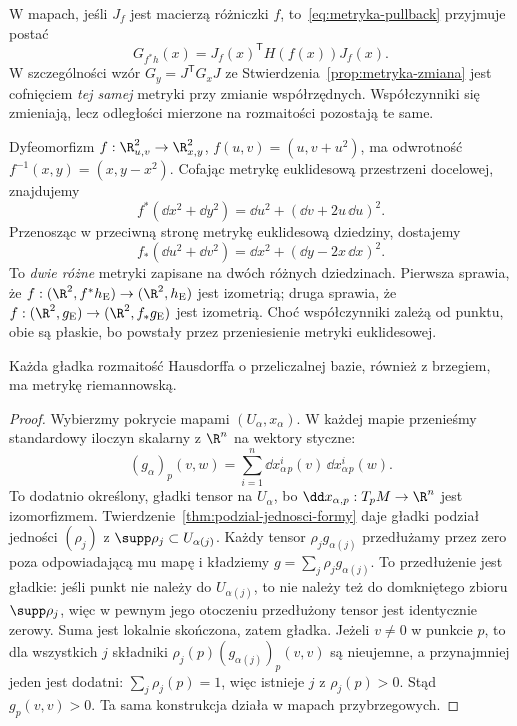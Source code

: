 W mapach, jeśli $J_f$ jest macierzą różniczki $f$,
to~\eqref{eq:metryka-pullback} przyjmuje postać
\[
 G_{f^*h}(x)=J_f(x)^{\mathsf T}H(f(x))J_f(x).
\]
W szczególności wzór
$G_y=J^{\mathsf T}G_xJ$ ze
Stwierdzenia~\ref{prop:metryka-zmiana} jest
cofnięciem \emph{tej samej} metryki przy zmianie
współrzędnych. Współczynniki się zmieniają, lecz
odległości mierzone na rozmaitości pozostają te same.

\begin{przyklad}
\label{prz:metryka-pull-push-przyklad}
Dyfeomorfizm $f:\R^2_{u,v}\to\R^2_{x,y}$,
$f(u,v)=(u,v+u^2)$, ma odwrotność
$f^{-1}(x,y)=(x,y-x^2)$. Cofając metrykę
euklidesową przestrzeni docelowej, znajdujemy
\[
 f^*(\dd x^2+\dd y^2)
 =\dd u^2+(\dd v+2u\,\dd u)^2.
\]
Przenosząc w przeciwną stronę metrykę euklidesową
dziedziny, dostajemy
\[
 f_*(\dd u^2+\dd v^2)
 =\dd x^2+(\dd y-2x\,\dd x)^2.
\]
To \emph{dwie różne} metryki zapisane na dwóch
różnych dziedzinach. Pierwsza sprawia, że
$f:(\R^2,f^*h_{\mathrm E})\to(\R^2,h_{\mathrm E})$
jest izometrią; druga sprawia, że
$f:(\R^2,g_{\mathrm E})\to(\R^2,f_*g_{\mathrm E})$
jest izometrią. Choć współczynniki zależą od punktu,
obie są płaskie, bo powstały przez przeniesienie
metryki euklidesowej.
\end{przyklad}

\begin{twierdzenie}
\label{thm:istnienie-metryki}
Każda gładka rozmaitość Hausdorffa o przeliczalnej bazie,
również z brzegiem, ma metrykę riemannowską.
\end{twierdzenie}
\begin{proof}
Wybierzmy pokrycie mapami $(U_\alpha,x_\alpha)$.
W każdej mapie przenieśmy standardowy iloczyn skalarny
z $\R^n$ na wektory styczne:
\[
 (g_\alpha)_p(v,w)
 =\sum_{i=1}^n
   \dd x_\alpha^i{}_p(v)\,\dd x_\alpha^i{}_p(w).
\]
To dodatnio określony, gładki tensor na $U_\alpha$,
bo $\dd x_{\alpha,p}:T_pM\to\R^n$ jest izomorfizmem.
Twierdzenie~\ref{thm:podzial-jednosci-formy}
daje gładki podział jedności $(\rho_j)$
z $\supp\rho_j\subset U_{\alpha(j)}$.
Każdy tensor $\rho_jg_{\alpha(j)}$ przedłużamy przez
zero poza odpowiadającą mu mapę i kładziemy
$g=\sum_j\rho_jg_{\alpha(j)}$.
To przedłużenie jest gładkie: jeśli punkt nie należy
do $U_{\alpha(j)}$, to nie należy też do domkniętego
zbioru $\supp\rho_j$, więc w pewnym jego otoczeniu
przedłużony tensor jest identycznie zerowy.
Suma jest lokalnie skończona, zatem gładka.
Jeżeli $v\ne0$ w punkcie $p$, to dla wszystkich $j$
składniki $\rho_j(p)(g_{\alpha(j)})_p(v,v)$ są
nieujemne, a przynajmniej jeden jest dodatni:
$\sum_j\rho_j(p)=1$, więc istnieje $j$ z
$\rho_j(p)>0$. Stąd $g_p(v,v)>0$.
Ta sama konstrukcja działa w mapach przybrzegowych.
\end{proof}

